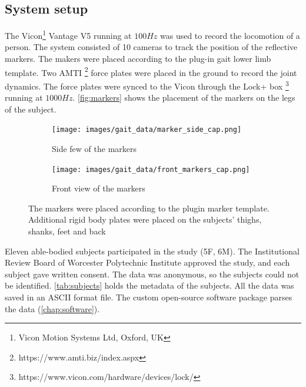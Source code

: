 \subsection{System setup}
\label{sec:setup}
The Vicon\footnote{Vicon Motion Systems Ltd, Oxford, UK}  Vantage V5 running at $100Hz$ was used to record the locomotion of a person. The system consisted of 10 cameras to track the position of the reflective markers. The makers were placed according to the plug-in gait lower limb template. Two AMTI \footnote{https://www.amti.biz/index.aspx} force plates were placed in the ground to record the joint dynamics. The force plates were synced to the Vicon through the Lock+ box \footnote{https://www.vicon.com/hardware/devices/lock/} running at $1000Hz$. \autoref{fig:markers} shows the placement of the markers on the legs of the subject. 



\begin{figure}
\centering 
\begin{subfigure}{0.4\linewidth} 
  \centering 
  \texttt{[image: images/gait\_data/marker\_side\_cap.png]} 
  \caption[Side Marker Placement]{Side few of the markers} 
  \label{fig:markers_side} 
\end{subfigure} 
%
\begin{subfigure}{0.4\linewidth} 
  \centering 
  \texttt{[image: images/gait\_data/front\_markers\_cap.png]} 
  \caption[Front Marker Placement]{Front view of the markers} 
  \label{fig:markers_front} 
\end{subfigure} 
\caption[Marker Placement]{The markers were placed according to the plugin marker template. Additional rigid body plates were placed on the subjects' thighs, shanks, feet and back} 
\label{fig:markers} 

\end{figure} 


Eleven able-bodied subjects participated in the study (5F, 6M). The Institutional Review Board of Worcester Polytechnic Institute approved the study, and each subject gave written consent. The data was anonymous, so the subjects could not be identified. \autoref{tab:subjects} holds the metadata of the subjects. All the data was saved in an ASCII format file. The custom open-source software package parses the data (\autoref{chap:software}).

